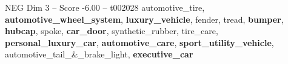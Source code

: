 \begin{textsample}{NEG Dim 3 – Score -6.00 – t002028}  \label{ex:f3_neg_017}
automotive\_tire, \textbf{automotive\_wheel\_system}, \textbf{luxury\_vehicle}, fender, tread, \textbf{bumper}, \textbf{hubcap}, spoke, \textbf{car\_door}, synthetic\_rubber, tire\_care, \textbf{personal\_luxury\_car}, \textbf{automotive\_care}, \textbf{sport\_utility\_vehicle}, automotive\_tail\_\&\_brake\_light, \textbf{executive\_car}

\end{textsample}
